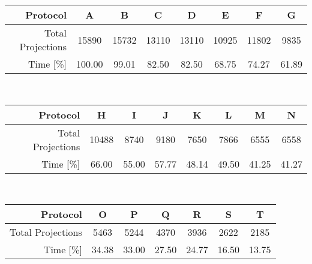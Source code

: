\cbstart
\begin{table*}[htp]
	\centering%
	\label{tab:protocols}%
	\caption{Specification of different protocols and time used compared to gold standard. Protocol A corresponds to the Gold Standard, and would have been needed to cover the same FOV with 9 independent scans with a detector width of 1024 pixels (plus an overlap of 100 pixels), resulting in a number of projections $N_{A}=9(1024+100)\frac{\pi}{2}=15890$. Protocol B corresponds to the protocol shown in figure~\ref{subfig:protocolb}, resulting in a total number of projections of $N_{B}=3(3072+200)\frac{\pi}{2}=15419$.}%
	\begin{tabular*}{\textwidth}{r@{\extracolsep\fill}ccccccc}%
	\toprule%
		Protocol & A & B & C & D & E & F & G \\%
		\midrule%
		Total Projections & 15890 & 15732 & 13110 & 13110 & 10925 & 11802 & 9835 \\
		Time [\%] & 100.00 & 99.01 & 82.50 & 82.50 & 68.75 & 74.27 & 61.89 \\
		\bottomrule%
	\end{tabular*}%
	\\%
	\begin{tabular*}{\textwidth}{r@{\extracolsep\fill}ccccccc}%
		Protocol & H & I & J & K & L & M & N \\%
		\midrule%
		Total Projections & 10488 & 8740 & 9180 & 7650 & 7866 & 6555 & 6558 \\
		Time [\%] & 66.00 & 55.00 & 57.77 & 48.14 & 49.50 & 41.25 & 41.27 \\
		\bottomrule%
	\end{tabular*}%
	\\%
	\begin{tabular*}{\textwidth}{r@{\extracolsep\fill}cccccc}%
		Protocol & O & P & Q & R & S & T \\%
		\midrule%
		Total Projections & 5463 & 5244 & 4370 & 3936 & 2622 & 2185 \\
		Time [\%] & 34.38 & 33.00 & 27.50 & 24.77 & 16.50 & 13.75 \\
		\bottomrule%
	\end{tabular*}%
\end{table*}
\cbend

